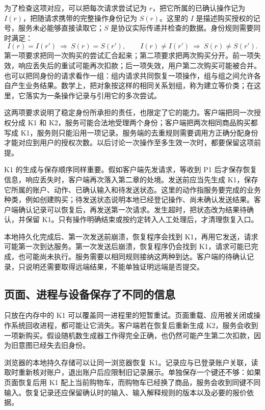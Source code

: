 为了检查这项对应，可以把每次请求尝试记为 \(r\)，把它所属的已确认操作记为 \(I(r)\)，把随请求携带的完整操作身份记为 \(S(r)\)。这里的 \(I\) 是描述购买授权的记号，服务未必能够直接读取它；\(S\) 是协议实际传递并检查的数据。身份规则需要同时满足：
\[
 I(r)=I(r')\ \Longrightarrow\ S(r)=S(r'),\qquad
 I(r)\ne I(r')\ \Longrightarrow\ S(r)\ne S(r').
\]
第一项要求把同一次购买的尝试汇合起来；第二项要求把两次购买分开。前一项失效，响应丢失后的重试可能再次扣款；后一项失效，用户第二次购买可能被合并。也可以把同身份的请求看作一组：组内请求共同恢复一项操作，组与组之间允许各自产生业务结果。数学上，把对象按这样的相同关系划组，称为建立等价类；在这里，它落实为一条操作记录与引用它的多次尝试。



这两项要求说明了稳定身份所承担的责任，也限定了它的能力。客户端把同一次授权分成 K1 和 K2，服务可能合法地受理两个身份；客户端把两次相同商品购买都写成 K1，服务则只能沿用一项记录。服务端的去重规则需要调用方正确分配身份才能对应到用户的授权次数。以后讨论一次操作至多生效一次时，都要保留这项前提。

K1 的生成与保存顺序同样重要。假如客户端先发请求，等收到 P1 后才保存恢复信息，响应丢失时，客户端再次落入第二章的处境。发送前应当先生成 K1，保存它所属的账户、动作、已确认输入和待发送状态。这里的动作指服务要完成的业务种类，例如创建购买；待发送状态说明本地已经登记操作、尚未确认发送结果。客户端确认记录可以恢复后，再发送第一次请求。发生超时，把状态改为结果待确认，并保留 K1。只有操作明确结束或按约定转入人工处理后，才清理恢复入口。

本地持久化完成后、第一次发送前崩溃，恢复程序会找到 K1，再用它发送，请求可能第一次到达服务。第一次发送后崩溃，恢复程序仍会找到 K1，请求可能已完成，也可能尚未执行。服务需要以相同规则接纳这两种到达。客户端的待确认记录，只说明还需要取得远端结果，不能单独证明远端是否提交。



\subsection*{页面、进程与设备保存了不同的信息}

只放在内存中的 K1 可以覆盖同一进程里的短暂重试。页面重载、应用被关闭或操作系统回收进程，都可能让它消失。客户端若在恢复后重新生成 K2，服务会收到一项新购买。假设随机数生成器工作得完全正确，也仍然可能产生第二次扣款，因为旧意图已经失去旧身份。

浏览器的本地持久存储可以让同一浏览器恢复 K1。记录应与已登录账户关联，读取时重新核对账户，退出账户后应限制旧记录展示。单独保存一个键还不够：如果页面恢复后用 K1 配上当前购物车，而购物车已经换了商品，服务会收到同键不同输入。恢复记录还应保留确认时的输入、输入解释规则的版本以及必要的报价依据。

